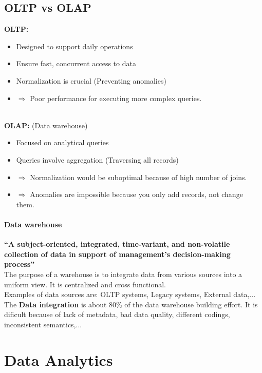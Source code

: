 \documentclass[a4paper,twoside,10pt]{report}
\begin{document}
\subsection{OLTP vs OLAP}
\textbf{OLTP:}
\begin{itemize}
	\item Designed to support daily operations
	\item Ensure fast, concurrent access to data
	\item Normalization is crucial (Preventing anomalies)
	\item $\Rightarrow$ Poor performance for executing more complex queries.
\end{itemize}
~\\
\textbf{OLAP:} (Data warehouse)
\begin{itemize}
	\item Focused on analytical queries
	\item Queries involve aggregation (Traversing all records)
	\item $\Rightarrow$ Normalization would be suboptimal because of high number of joins.
	\item $\Rightarrow$ Anomalies are impossible because you only add records, not change them.
\end{itemize}

\paragraph{Data warehouse}
\textbf{``A subject-oriented, integrated, time-variant, and non-volatile
collection of data in support of management's decision-making
process''} \\
The purpose of a warehouse is to integrate data from various sources into a uniform view. It is centralized and cross functional. \\
Examples of data sources are: OLTP systems, Legacy systems, External data,... \\
The \textbf{Data integration} is about 80\% of the data warehouse building effort. It is dificult because of lack of metadata, bad data quality, different codings, inconsistent semantics,...



\section{Data Analytics}
\end{document}
